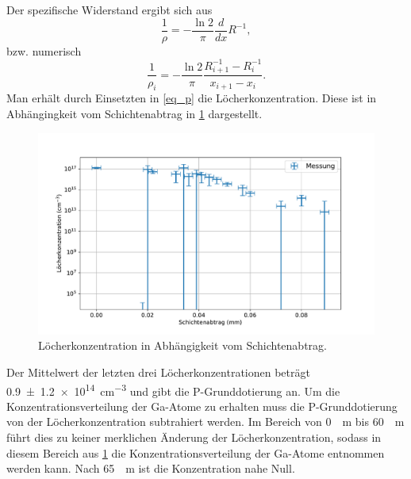 \documentclass[
	a4paper,
	12pt,
	pagesize,
	ngerman
]{scrartcl}
\begin{document}
	Der spezifische Widerstand ergibt sich aus
	\begin{equation}
		\label{eq_spez_wd_diff}
		\frac{1}{\rho} = - \frac{\ln 2}{\pi} \frac{d}{dx}R^{-1},
	\end{equation}
	bzw. numerisch
	\begin{equation}
		\frac{1}{\rho_i} = - \frac{\ln 2 }{\pi} \frac{R^{-1}_{i+1}-R^{-1}_{i}}{x_{i+1}-x_i}.
	\end{equation}
	Man erhält durch Einsetzten in \cref{eq_p} die Löcherkonzentration.
	Diese ist in Abhängingkeit vom Schichtenabtrag in \cref{fig_polier_konz} dargestellt.

	\begin{figure}[H]
			\includegraphics[width=\linewidth]{img/polier_konz.pdf}
			\caption{
			Löcherkonzentration in Abhängigkeit vom Schichtenabtrag.
							}
			\label{fig_polier_konz}
	\end{figure}

	Der Mittelwert der letzten drei Löcherkonzentrationen beträgt \SI{0.9+-1.2e14}{cm^{-3}} und gibt die P-Grunddotierung an.
	Um die Konzentrationsverteilung der Ga-Atome zu erhalten muss die P-Grunddotierung von der Löcherkonzentration subtrahiert werden.
	Im Bereich von \SI{0}{\mu m} bis \SI{60}{\mu m} führt dies zu keiner merklichen Änderung der Löcherkonzentration, sodass in diesem Bereich aus \cref{fig_polier_konz} die Konzentrationsverteilung der Ga-Atome entnommen werden kann.
	Nach \SI{65}{\mu m} ist die Konzentration nahe Null.
\end{document}
